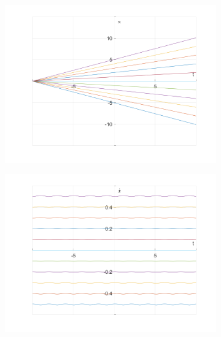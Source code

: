 \documentclass{article}
\begin{document}
	\begin{figure}[h!]
		\centering
		\begin{subfigure}[b]{0.48\linewidth}
			\includegraphics[width=\linewidth]{./SmallOscillations/S7/F3.png}
		\end{subfigure}
		\begin{subfigure}[b]{0.48\linewidth}
			\includegraphics[width=\linewidth]{./SmallOscillations/S7/F4.png}
		\end{subfigure}
	\end{figure}
	
\end{document}
